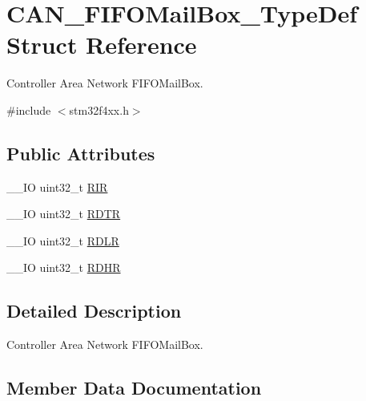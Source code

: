 \hypertarget{struct_c_a_n___f_i_f_o_mail_box___type_def}{}\section{C\+A\+N\+\_\+\+F\+I\+F\+O\+Mail\+Box\+\_\+\+Type\+Def Struct Reference}
\label{struct_c_a_n___f_i_f_o_mail_box___type_def}


Controller Area Network F\+I\+F\+O\+Mail\+Box.  




{\ttfamily \#include $<$stm32f4xx.\+h$>$}

\subsection*{Public Attributes}
\begin{DoxyCompactItemize}
\item 
\+\_\+\+\_\+\+I\+O uint32\+\_\+t \hyperlink{struct_c_a_n___f_i_f_o_mail_box___type_def_a034504d43f7b16b320745a25b3a8f12d}{R\+I\+R}
\item 
\+\_\+\+\_\+\+I\+O uint32\+\_\+t \hyperlink{struct_c_a_n___f_i_f_o_mail_box___type_def_a49d74ca8b402c2b9596bfcbe4cd051a9}{R\+D\+T\+R}
\item 
\+\_\+\+\_\+\+I\+O uint32\+\_\+t \hyperlink{struct_c_a_n___f_i_f_o_mail_box___type_def_ac7d62861de29d0b4fcf11fabbdbd76e7}{R\+D\+L\+R}
\item 
\+\_\+\+\_\+\+I\+O uint32\+\_\+t \hyperlink{struct_c_a_n___f_i_f_o_mail_box___type_def_a95890984bd67845015d40e82fb091c93}{R\+D\+H\+R}
\end{DoxyCompactItemize}


\subsection{Detailed Description}
Controller Area Network F\+I\+F\+O\+Mail\+Box. 

\subsection{Member Data Documentation}
\hypertarget{struct_c_a_n___f_i_f_o_mail_box___type_def_a95890984bd67845015d40e82fb091c93}{}
